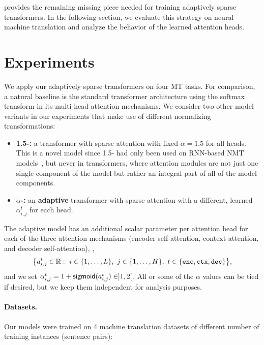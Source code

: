  provides the remaining missing
piece needed for training adaptively sparse transformers. In the
following section, we evaluate this strategy on neural machine
translation and analyze the behavior of the learned attention heads.

\section{Experiments}

\noindent We apply our adaptively sparse transformers on four MT tasks.
For comparison, a natural baseline is the standard transformer
architecture using the softmax transform in its multi-head attention mechanisms.
We consider two other model variants in our experiments that make use of different
normalizing transformations:

\begin{itemize}
    \item \textbf{1.5-\entmaxtext:} a transformer with sparse \entmaxtext
          attention with fixed $\alpha=1.5$ for all heads. This is a novel model
          since 1.5-\entmaxtext{} had only been used on
          RNN-based NMT models~\citep{entmax}, but never
          in transformers, where attention modules are not just one single
          component of the model but rather an integral part of all of
          the model components.%
    \item \textbf{\boldmath $\alpha$-\entmaxtext:} an \textbf{adaptive}
          transformer with sparse \entmaxtext attention with a different,
          learned $\alpha_{i,j}^t$ for each head.
\end{itemize}

The adaptive model has an additional scalar parameter per attention
head for each of the three attention mechanisms (encoder
self-attention, context attention, and decoder self-attention), \ie,
\begin{equation}
    \big \{ a_{i,j}^{t} \in \mathbb{R}:~
    i \in \{1, \dots, L\},~
    j \in \{1, \dots, H\},~
    t \in \{\texttt{enc}, \texttt{ctx}, \texttt{dec}\} \big\},
\end{equation}
and we set $\alpha_{i,j}^t = 1 + \operatorname*{\mathsf{sigmoid}}(a_{i,j}^t) \in ]1, 2[$.
All or some of the $\alpha$ values can be tied if desired, but we
keep them independent for analysis purposes.

\paragraph*{Datasets.} Our models were trained on 4 machine
translation datasets of different number of training instances
(sentence pairs):

